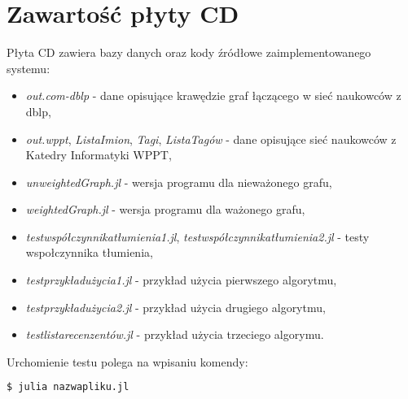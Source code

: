 \chapter{Zawartość płyty CD}
\thispagestyle{chapterBeginStyle}
\label{plytaCD}

Płyta CD zawiera bazy danych oraz kody źródłowe zaimplementowanego systemu:
\begin{itemize}
    \item \textit{out.com-dblp} - dane opisujące krawędzie graf łączącego w sieć naukowców z dblp,
    \item \textit{out.wppt}, \textit{ListaImion}, \textit{Tagi}, \textit{ListaTagów}  - dane opisujące sieć naukowców z Katedry Informatyki WPPT,
    \item \textit{unweightedGraph.jl} - wersja programu dla nieważonego grafu,
    \item \textit{weightedGraph.jl} - wersja programu dla ważonego grafu,
    \item \textit{testwspółczynnikatłumienia1.jl}, \textit{testwspółczynnikatłumienia2.jl} - testy wspołczynnika tłumienia,
    \item \textit{testprzykładużycia1.jl} - przykład użycia pierwszego algorytmu,
    \item \textit{testprzykładużycia2.jl} - przykład użycia drugiego algorytmu,
    \item \textit{testlistarecenzentów.jl} - przykład użycia trzeciego algorymu.
\end{itemize}

Urchomienie testu polega na wpisaniu komendy:
\begin{lstlisting}[language=bash]
    $ julia nazwapliku.jl
\end{lstlisting}

